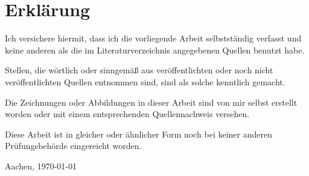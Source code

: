 \clearpage
\chapter*{Erklärung}\label{erklaerung}
Ich versichere hiermit, dass ich die vorliegende Arbeit selbstständig verfasst und keine anderen als die im Literaturverzeichnis angegebenen Quellen benutzt habe.

\bigskip

\noindent
Stellen, die wörtlich oder sinngemäß aus veröffentlichten oder noch nicht veröffentlichten Quellen entnommen sind, sind als solche kenntlich gemacht.

\bigskip

\noindent
Die Zeichnungen oder Abbildungen in dieser Arbeit sind von mir selbst erstellt worden oder mit einem entsprechenden Quellennachweis versehen.

\bigskip

\noindent
Diese Arbeit ist in gleicher oder ähnlicher Form noch bei keiner anderen Prüfungsbehörde eingereicht worden.

\vspace{1cm}
\noindent
Aachen, \today %

\vspace{7cm}



